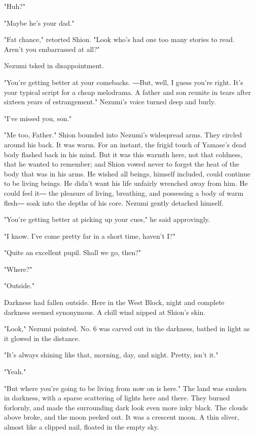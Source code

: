 "Huh?"

"Maybe he's your dad."

"Fat chance," retorted Shion. "Look who's had one too many stories to
read. Aren't you embarrassed at all?"

Nezumi tsked in disappointment.

"You're getting better at your comebacks. ―But, well, I guess you're
right. It's your typical script for a cheap melodrama. A father and son
reunite in tears after sixteen years of estrangement." Nezumi's voice
turned deep and burly.

"I've missed you, son."

"Me too, Father." Shion bounded into Nezumi's widespread arms. They
circled around his back. It was warm. For an instant, the frigid touch
of Yamase's dead body flashed back in his mind. But it was this warmth
here, not that coldness, that he wanted to remember; and Shion vowed
never to forget the heat of the body that was in his arms. He wished all
beings, himself included, could continue to be living beings. He didn't
want his life unfairly wrenched away from him. He could feel it― the
pleasure of living, breathing, and possessing a body of warm flesh― soak
into the depths of his core. Nezumi gently detached himself.

"You're getting better at picking up your cues," he said approvingly.

"I know. I've come pretty far in a short time, haven't I?"

"Quite an excellent pupil. Shall we go, then?"

"Where?"

"Outside."

Darkness had fallen outside. Here in the West Block, night and complete
darkness seemed synonymous. A chill wind nipped at Shion's skin.

"Look," Nezumi pointed. No. 6 was carved out in the darkness, bathed in
light as it glowed in the distance.

"It's always shining like that, morning, day, and night. Pretty, isn't
it."

"Yeah."

"But where you're going to be living from now on is here." The land was
sunken in darkness, with a sparse scattering of lights here and there.
They burned forlornly, and made the surrounding dark look even more inky
black. The clouds above broke, and the moon peeked out. It was a
crescent moon. A thin sliver, almost like a clipped nail, floated in the
empty sky.

